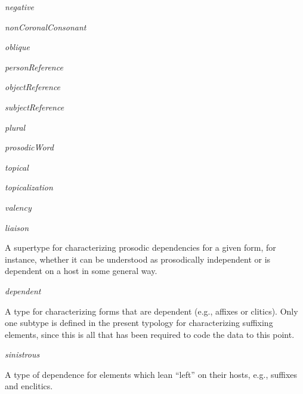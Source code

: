 \begin{ontologytop}
\begin{classlist}
	\item \emph{negative}


	\item \emph{nonCoronalConsonant}


	\item \emph{oblique}


	\item \emph{personReference}


		\begin{classlist}

		\item \emph{objectReference}


		\item \emph{subjectReference}


		\end{classlist}

	\item \emph{plural}


	\item \emph{prosodicWord}


	\item \emph{topical}


	\item \emph{topicalization}


	\item \emph{valency}


	\end{classlist}

\item \emph{liaison}
\hspace{1em}\parbox[t]{\linegoal}{\footnotesize A supertype for characterizing prosodic dependencies for a given form, for instance, whether it can be understood as prosodically independent or is dependent on a host in some general way.}


	\begin{classlist}

	\item \emph{dependent}
	\hspace{1em}\parbox[t]{\linegoal}{\footnotesize A type for characterizing forms that are dependent (e.g., affixes or clitics). Only one subtype is defined in the present typology for characterizing suffixing elements, since this is all that has been required to code the data to this point.}


		\begin{classlist}

		\item \emph{sinistrous}
		\hspace{1em}\parbox[t]{\linegoal}{\footnotesize A type of dependence for elements which lean ``left'' on their hosts, e.g., suffixes and enclitics.}



\end{classlist}
\end{classlist}
\end{ontologytop}
